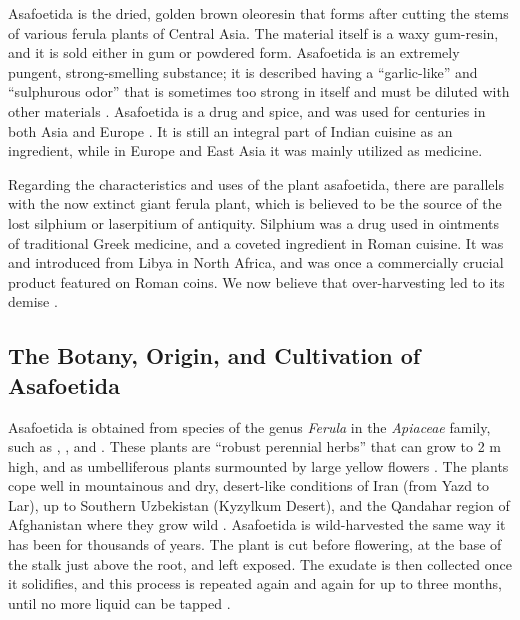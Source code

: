 Asafoetida is the dried, golden brown oleoresin that forms after cutting the stems of various ferula plants of Central Asia. The material itself is a waxy gum-resin, and it is sold either in gum or powdered form. Asafoetida is an extremely pungent, strong-smelling substance; it is described having a ``garlic-like'' and ``sulphurous odor'' that is sometimes too strong in itself and must be diluted with other materials \autocite[138]{van_wyk_culinary_2014}. Asafoetida is a drug and spice, and was used for centuries in both Asia and Europe \autocite{leung_itinerary_2019}. It is still an integral part of Indian cuisine as an ingredient, while in Europe and East Asia it was mainly utilized as medicine.

Regarding the characteristics and uses of the plant asafoetida, there are parallels with the now extinct giant ferula plant, which is believed to be the source of the lost silphium or laserpitium of antiquity. Silphium was a drug used in ointments of traditional Greek medicine, and a coveted ingredient in Roman cuisine. It was and introduced from Libya in North Africa, and was once a commercially crucial product featured on Roman coins. We now believe that over-harvesting led to its demise \autocites{dalby_dangerous_2000, leung_itinerary_2019, van_wyk_culinary_2014, langenheim_plant_2003}. 

\subsection{The Botany, Origin, and  Cultivation of Asafoetida}

Asafoetida is obtained from species of the genus \textit{Ferula} in the \textit{Apiaceae} family, such as , , and  \autocite{mabberley_mabberleys_2017}. These plants are ``robust perennial herbs'' that can grow to 2 m high, and as umbelliferous plants surmounted by large yellow flowers \autocite[138]{van_wyk_culinary_2014}.
The plants cope well in mountainous and dry, desert-like conditions of Iran (from Yazd to Lar), up to Southern Uzbekistan (Kyzylkum Desert), and the Qandahar region of Afghanistan where they grow wild \autocite{leung_itinerary_2019}.
Asafoetida is wild-harvested the same way it has been for thousands of years. The plant is cut before flowering, at the base of the stalk just above the root, and left exposed. The exudate is then collected once it solidifies, and this process is repeated again and again for up to three months, until no more liquid can be tapped \autocite[138]{van_wyk_culinary_2014}.

